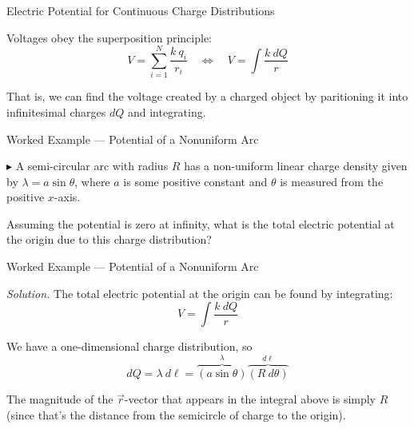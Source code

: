 \documentclass{beamer}
\begin{document}
\begin{frame}{Electric Potential for Continuous Charge Distributions}

Voltages obey the superposition principle:
\begin{equation*}
	V = \sum\limits_{i = 1}^{N} \frac{k\ q_i}{r_i} \quad \Longleftrightarrow \quad V = \int \frac{k\ dQ}{r}
\end{equation*}

That is, we can find the voltage created by a charged object by paritioning it into infinitesimal charges $dQ$ and integrating.

\end{frame}

\begin{frame}{Worked Example --- Potential of a Nonuniform Arc}

$\blacktriangleright$ A semi-circular arc with radius $R$ has a non-uniform linear charge density given by $\lambda = a \sin{\theta}$, where $a$ is some positive constant and $\theta$ is measured from the positive $x$-axis.

\begin{figure}[H]
\centering
{}
\end{figure}

Assuming the potential is zero at infinity, what is the total electric potential at the origin due to this charge distribution?

\end{frame}

\begin{frame}{Worked Example --- Potential of a Nonuniform Arc}

\textit{Solution.} The total electric potential at the origin can be found by integrating:
\begin{equation*}
    V = \int \frac{k\ dQ}{r}
\end{equation*}

We have a one-dimensional charge distribution, so
\begin{equation*}
    dQ = \lambda\ d\ell = \overbrace{\left( a \sin{\theta} \right)}^{\lambda} \overbrace{\left( R\ d\theta \right)}^{d\ell}
\end{equation*}

The magnitude of the $\vec{r}$-vector that appears in the integral above is simply $R$ (since that's the distance from the semicircle of charge to the origin).

\end{frame}
\end{document}
